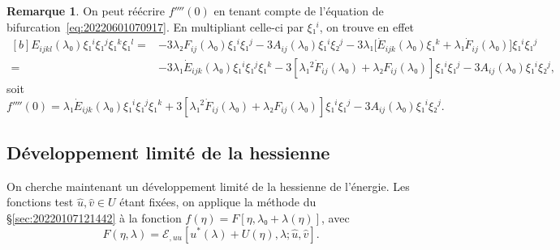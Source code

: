\documentclass[12pt, final]{amsart}
\theoremstyle{definition}
\newtheorem{remark}{Remarque}
\begin{document}
\begin{remark}
  On peut réécrire \(f''''(0)\) en tenant compte de l'équation de
  bifurcation~\eqref{eq:20220601070917}. En multipliant celle-ci par \(ξ₁^i\),
  on trouve en effet
 \begin{equation*}
   \begin{aligned}[b]
     E_{i j k l}(λ₀) ξ₁^i ξ₁^j ξ₁^k ξ₁^l
     ={} & - 3 λ₂ F_{i j}(λ₀) ξ₁^i ξ₁^j - 3 A_{i j}(λ₀) ξ₁^i ξ₂^j - 3 λ₁ \bigl[\dot{E}_{i j k} (λ₀) ξ₁^k + λ₁ \dot{F}_{i j}(λ₀)\bigr] ξ₁^i ξ₁^j\\
     ={} & - 3 λ₁ \dot{E}_{i j k}(λ₀) ξ₁^i ξ₁^j ξ₁^k - 3 [λ₁^2 \dot{F}_{i j} (λ₀) + λ₂ F_{i j}(λ₀)] ξ₁^i ξ₁^j - 3 A_{i j}(λ₀) ξ₁^i ξ₂^j,
   \end{aligned}
 \end{equation*}
 soit
 \begin{equation}
   f''''(0) = λ₁ \dot{E}_{i j k}(λ₀) ξ₁^i ξ₁^j ξ₁^k + 3 [λ₁^2 \dot{F}_{i j} (λ₀) + λ₂ F_{i j}(λ₀)] ξ₁^i ξ₁^j - 3 A_{i j}(λ₀) ξ₁^i ξ₂^j.
 \end{equation}
\end{remark}

\subsection{Développement limité de la hessienne}

On cherche maintenant un développement limité de la hessienne de l'énergie. Les
fonctions test \(\hat{u}, \hat{v} ∈ U\) étant fixées, on applique la méthode du
\S\ref{sec:20220107121442} à la fonction \(f(η) = F [η, λ₀ + λ(η)]\), avec
\begin{equation}
  F(η, λ) =ℰ_{, u u} [u^{\ast}(λ) + U(η), λ; \hat{u}, \hat{v}].
\end{equation}
\end{document}
